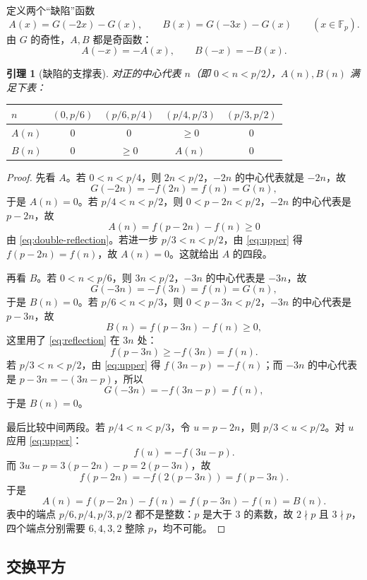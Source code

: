 \documentclass[11pt,a4paper]{ctexart}
\theoremstyle{plain}
\newtheorem{lemma}[theorem]{引理}
\theoremstyle{definition}
\newcommand{\Fp}{\mathbb{F}_p}
\begin{document}
定义两个“缺陷”函数
\begin{equation}
  A(x)=G(-2x)-G(x),\qquad B(x)=G(-3x)-G(x)\qquad(x\in\Fp).
  \label{eq:defects}
\end{equation}
由 $G$ 的奇性，$A,B$ 都是奇函数：
\[
  A(-x)=-A(x),\qquad B(-x)=-B(x).
\]

\begin{lemma}[缺陷的支撑表]
\label{lem:support}
对正的中心代表 $n$（即 $0<n<p/2$），$A(n),B(n)$ 满足下表：
\begin{center}
\renewcommand{\arraystretch}{1.25}
\begin{tabular}{@{}lcccc@{}}
\toprule
$n$ & $(0,p/6)$ & $(p/6,p/4)$ & $(p/4,p/3)$ & $(p/3,p/2)$ \\
\midrule
$A(n)$ & $0$ & $0$ & $\ge0$ & $0$ \\
$B(n)$ & $0$ & $\ge0$ & $A(n)$ & $0$ \\
\bottomrule
\end{tabular}
\end{center}
\end{lemma}

\begin{proof}
先看 $A$。若 $0<n<p/4$，则 $2n<p/2$，$-2n$ 的中心代表就是 $-2n$，故
\[
  G(-2n)=-f(2n)=f(n)=G(n),
\]
于是 $A(n)=0$。若 $p/4<n<p/2$，则 $0<p-2n<p/2$，$-2n$ 的中心代表是 $p-2n$，故
\[
  A(n)=f(p-2n)-f(n)\ge0
\]
由 \eqref{eq:double-reflection}。若进一步 $p/3<n<p/2$，由 \eqref{eq:upper} 得 $f(p-2n)=f(n)$，故 $A(n)=0$。这就给出 $A$ 的四段。

再看 $B$。若 $0<n<p/6$，则 $3n<p/2$，$-3n$ 的中心代表是 $-3n$，故
\[
  G(-3n)=-f(3n)=f(n)=G(n),
\]
于是 $B(n)=0$。若 $p/6<n<p/3$，则 $0<p-3n<p/2$，$-3n$ 的中心代表是 $p-3n$，故
\[
  B(n)=f(p-3n)-f(n)\ge0,
\]
这里用了 \eqref{eq:reflection} 在 $3n$ 处：
\[
  f(p-3n)\ge -f(3n)=f(n).
\]
若 $p/3<n<p/2$，由 \eqref{eq:upper} 得 $f(3n-p)=-f(n)$；而 $-3n$ 的中心代表是 $p-3n=-(3n-p)$，所以
\[
  G(-3n)=-f(3n-p)=f(n),
\]
于是 $B(n)=0$。

最后比较中间两段。若 $p/4<n<p/3$，令 $u=p-2n$，则 $p/3<u<p/2$。对 $u$ 应用 \eqref{eq:upper}：
\[
  f(u)=-f(3u-p).
\]
而 $3u-p=3(p-2n)-p=2(p-3n)$，故
\[
  f(p-2n)=-f(2(p-3n))=f(p-3n).
\]
于是
\[
  A(n)=f(p-2n)-f(n)=f(p-3n)-f(n)=B(n).
\]
表中的端点 $p/6,p/4,p/3,p/2$ 都不是整数：$p$ 是大于 $3$ 的素数，故 $2\nmid p$ 且 $3\nmid p$，四个端点分别需要 $6,4,3,2$ 整除 $p$，均不可能。
\end{proof}

\subsection{交换平方}
\label{sec:commuting}
\label{sec:small-p}
\end{document}
